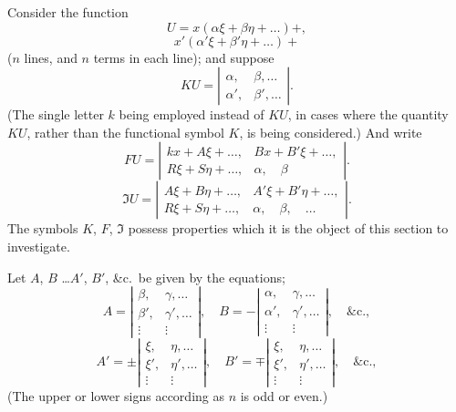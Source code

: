 \documentclass[11pt,a4paper]{article}
\theoremstyle{plain}
\theoremstyle{definition}
\theoremstyle{remark}
\begin{document}
Consider the function
\[
U = x(\alpha\xi + \beta\eta + \ldots) +
\tag{1},
\]
\[
x'(\alpha'\xi + \beta'\eta + \ldots) +
\]
($n$ lines, and $n$ terms in each line);
and suppose
\[
KU = \left|\begin{array}{cc}
\alpha, & \beta, \ldots \\
\alpha', & \beta', \ldots
\end{array}\right|
\tag{2}.
\]
(The single letter $k$ being employed instead of $KU$, in cases where the quantity $KU$,
rather than the functional symbol $K$, is being considered.) And write
\[
FU = \left|\begin{array}{cc}
kx + A\xi + \ldots, & Bx + B'\xi + \ldots, \\
R\xi + S\eta + \ldots, & \alpha, \quad \beta
\end{array}\right|
\tag{3}.
\]
\[
\mathfrak{I}U = \left|\begin{array}{cc}
A\xi + B\eta + \ldots, & A'\xi + B'\eta + \ldots, \\
R\xi + S\eta + \ldots, & \alpha, \quad \beta, \quad \ldots
\end{array}\right|
\tag{4}.
\]
The symbols $K$, $F$, $\mathfrak{I}$ possess properties which it is the object of this section to
investigate.

\newpage
Let $A$, $B$ \ldots $A'$, $B'$, \&c.\ be given by the equations;
\[
A = \left|\begin{array}{cc}
\beta, & \gamma, \ldots \\
\beta', & \gamma', \ldots \\
\vdots & \vdots
\end{array}\right|, \quad
B = -\left|\begin{array}{cc}
\alpha, & \gamma, \ldots \\
\alpha', & \gamma', \ldots \\
\vdots & \vdots
\end{array}\right|, \quad \&\text{c.},
\]
\[
A' = \pm\left|\begin{array}{cc}
\xi, & \eta, \ldots \\
\xi', & \eta', \ldots \\
\vdots & \vdots
\end{array}\right|, \quad
B' = \mp\left|\begin{array}{cc}
\xi, & \eta, \ldots \\
\xi', & \eta', \ldots \\
\vdots & \vdots
\end{array}\right|, \quad \&\text{c.},
\]
(The upper or lower signs according as $n$ is odd or even.)
\end{document}
